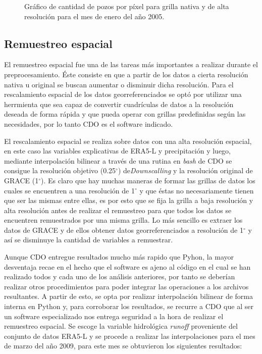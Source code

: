     \begin{figure}[H]
        \centering
              \goodgap
              \vskip -0.1in
        \caption[Cantidad de pozos en cada grilla]{Gráfico de cantidad de pozos por píxel para grilla nativa y de alta resolución para el mes de enero del año 2005.}
        \label{pixeldepth}
    \end{figure}

    \subsection{Remuestreo espacial}
    
    El remuestreo espacial fue una de las tareas más importantes a realizar durante el preprocesamiento. Éste consiste en que a partir de los datos a cierta
    resolución nativa u original se buscan aumentar o disminuir dicha resolución. Para el rescalamiento espacial de los datos georreferenciados se optó por utilizar una herrmienta que sea capaz de convertir 
    cuadrículas de datos a la resolución deseada de forma rápida y que pueda operar con grillas predefinidas según las necesidades, por lo tanto CDO es el software indicado. 

    
    El rescalamiento espacial se realiza sobre datos con una alta resolución espacial, en este caso las variables explicativas de ERA5-L y precipitación y luego, mediante interpolación bilinear a través de una rutina en \textit{bash} de CDO se consigue
    la resolución objetivo (0.25$^\circ$) de\textit{Downscalling} y la resolución original de GRACE (1$^\circ$). Es claro que hay muchas maneras de formar las grillas de datos los cuales se encuentren a una resolución de 
    1$^\circ$ y que éstas no necesariamente tienen que ser las mismas entre ellas, es por esto que se fija la grilla a baja resolución y alta resolución antes de realizar el remuestreo
    para que todos los datos se encuentren remuestrados por una misma grilla. Lo más sencillo es extraer los datos de GRACE y de ellos obtener datos georreferenciados a resolución de 1$^\circ$ y así se disminuye la cantidad de
    variables a remuestrar.

    Aunque CDO entregue resultados mucho más rapido que Pyhon, la mayor desventaja recae en el hecho que el software es ajeno al código en el cual se han realizado todos y cada uno de los análisis anteriores, por tanto se deberían realizar otros procedimientos para poder integrar las operaciones a los archivos resultantes.
    A partir de esto, se opta por realizar interpolación bilinear de forma interna en Python y, para corroborar los resultados, se recurre a CDO que al ser un software especializado nos entrega seguridad a la hora de realizar el remuestreo
    espacial. Se escoge la variable hidrológica \textit{runoff} proveniente del conjunto de datos ERA5-L y se procede a realizar las interpolaciones para el mes de marzo del año 2009, para este mes se obtuvieron los siguientes resultados:
    
